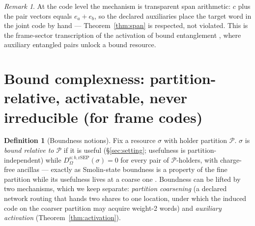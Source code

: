 \documentclass[11pt]{article}
\theoremstyle{plain}
\theoremstyle{definition}
\newtheorem{definition}[theorem]{Definition}
\theoremstyle{remark}
\newtheorem{remark}[theorem]{Remark}
\theoremstyle{plain}
\newcommand{\Om}{\Omega}
\begin{document}
\begin{remark}
At the code level the mechanism is transparent span arithmetic:
$c$ plus the pair vectors equals $e_a+e_b$, so the declared
auxiliaries place the target word in the joint code by hand ---
Theorem~\ref{thm:span} is respected, not violated. This is the
frame-sector transcription of the activation of bound
entanglement \cite{hhh1999,durcirac2000,sst2003,masanes2006},
where auxiliary entangled pairs unlock a bound resource.
\end{remark}

\section{Bound complexness: partition-relative, activatable,
never irreducible (for frame codes)}\label{sec:bound}

\begin{definition}[Boundness notions]\label{def:bound}
Fix a resource $\sigma$ with holder partition $\mathcal P$.
$\sigma$ is \emph{bound relative to $\mathcal P$} if it is useful
(\S\ref{sec:setting}; usefulness is partition-independent) while
$D^{a:b,\mathrm{rSEP}}_\Om(\sigma) = 0$ for every pair of
$\mathcal P$-holders, with charge-free ancillas --- exactly as
Smolin-state boundness is a property of the fine partition while
its usefulness lives at a coarse one \cite{smolin2001}. Boundness
can be lifted by two mechanisms, which we keep separate:
\emph{partition coarsening} (a declared network routing that hands
two shares to one location, under which the induced code on the
coarser partition may acquire weight-2 words) and
\emph{auxiliary activation} (Theorem~\ref{thm:activation}).
\end{definition}
\end{document}
